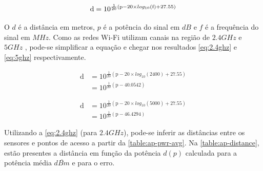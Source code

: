 \begin{equation}
	\text{d} = 10 ^{ \frac{1}{20} \left( \text{p} - 20 \times log_{10}\left(\text{f}\right)  + 27.55 \right) } \label{eq:distan}\\
\end{equation}

O $d$ é a distância em metros, $p$ é a potência do sinal em $dB$ e $f$
é a frequência do sinal em $MHz$. Como as redes Wi-Fi utilizam canais na região
de $2.4GHz$ e $5GHz$ \cite{ieee80211}, pode-se simplificar a equação e chegar nos
resultados \autoref{eq:2.4ghz} e \autoref{eq:5ghz} respectivamente.

\begin{align}
\text{d}	&= 10 ^{ \frac{1}{20} \left( \text{p} - 20 \times log_{10}\left(\text{2400}\right)  + 27.55 \right) } \nonumber \\
			&= 10 ^{ \frac{1}{20} \left( \text{p} - 40.0542 \right) } \label{eq:2.4ghz}
\end{align}

\begin{align}
\text{d}	&= 10 ^{ \frac{1}{20} \left( \text{p} - 20 \times log_{10}\left(\text{5000}\right)  + 27.55 \right) } \nonumber \\
			&= 10 ^{ \frac{1}{20} \left( \text{p} - 46.4294 \right) } \label{eq:5ghz}
\end{align}

Utilizando a \autoref{eq:2.4ghz} (para $2.4GHz$), pode-se inferir as distâncias entre os sensores
e pontos de acesso a partir da \autoref{table:ap-pwr-avg}. Na
\autoref{table:ap-distance}, estão presentes a distância em função da potência $d(p)$
calculada para a potência média $\overline{dBm}$ e para o erro.


